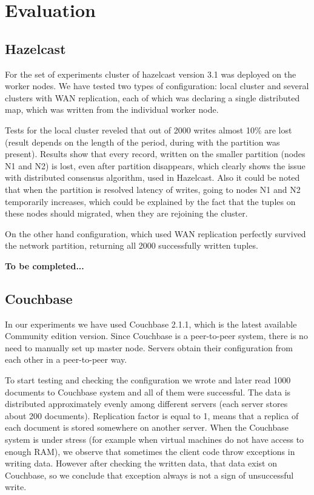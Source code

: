 \documentclass[a4paper]{article}
\begin{document}
\section{Evaluation}

\subsection{Hazelcast}

For the set of experiments cluster of hazelcast version 3.1 was deployed on the worker nodes. 
We have tested two types of configuration: local cluster and several clusters with WAN replication, each of which was declaring a single distributed map, which was written from the individual worker node.

Tests for the local cluster reveled that out of 2000 writes almost 10\% are lost (result depends on the length of the period, during with the partition was present).
Results show that every record, written on the smaller partition (nodes N1 and N2) is lost, even after partition disappears, which clearly shows the issue with distributed consensus algorithm, used in Hazelcast.
Also it could be noted that when the partition is resolved latency of writes, going to nodes N1 and N2 temporarily increases, which could be explained by the fact that the tuples on these nodes should migrated, when they are rejoining the cluster.

On the other hand configuration, which used WAN replication perfectly survived the network partition, returning all 2000 successfully written tuples.

{\bf To be completed...}

\subsection{Couchbase}

In our experiments we have used Couchbase 2.1.1, which is the latest available Community edition version. 
Since Couchbase is a peer-to-peer system, there is no need to manually set up master node. 
Servers obtain their configuration from each other in a peer-to-peer way.

To start testing and checking the configuration we wrote and later read 1000 documents to Couchbase system and all of them were successful. 
The data is distributed approximately evenly among different servers (each server stores about 200 documents).
Replication factor is equal to 1, means that a replica of each document is stored somewhere on another server.
When the Couchbase system is under stress (for example when virtual machines do not have access to enough RAM), we observe that sometimes the client code throw exceptions in writing data.
However after checking the written data, that data exist on Couchbase, so we conclude that exception always is not a sign of unsuccessful write.  
\end{document}
